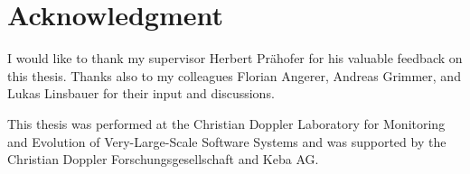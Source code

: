 \chapter{Acknowledgment}

I would like to thank my supervisor Herbert Prähofer for his valuable feedback on this thesis. Thanks also to my 
colleagues Florian Angerer, Andreas Grimmer, and Lukas Linsbauer for their input and discussions.

This thesis was performed at the Christian Doppler Laboratory for Monitoring and Evolution of Very-Large-Scale Software 
Systems and was supported by the Christian Doppler \foreignlanguage{ngerman}{Forschungsgesellschaft} and Keba AG.
